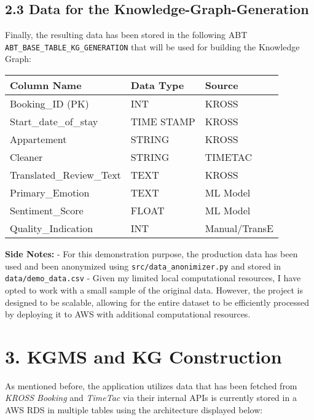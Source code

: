 \subsection{2.3 Data for the
Knowledge-Graph-Generation}\label{data-for-the-knowledge-graph-generation}

Finally, the resulting data has been stored in the following ABT
\texttt{ABT\_BASE\_TABLE\_KG\_GENERATION} that will be used for building
the Knowledge Graph:

\begin{longtable}[]{@{}lll@{}}
\toprule\noalign{}
Column Name & Data Type & Source \\
\midrule\noalign{}
\endhead
\bottomrule\noalign{}
\endlastfoot
Booking\_ID (PK) & INT & KROSS \\
Start\_date\_of\_stay & TIME STAMP & KROSS \\
Appartement & STRING & KROSS \\
Cleaner & STRING & TIMETAC \\
Translated\_Review\_Text & TEXT & KROSS \\
Primary\_Emotion & TEXT & ML Model \\
Sentiment\_Score & FLOAT & ML Model \\
Quality\_Indication & INT & Manual/TransE \\
\end{longtable}

\textbf{Side Notes:} - For this demonstration purpose, the production
data has been used and been anonymized using
\texttt{src/data\_anonimizer.py} and stored in
\texttt{data/demo\_data.csv} - Given my limited local computational
resources, I have opted to work with a small sample of the original
data. However, the project is designed to be scalable, allowing for the
entire dataset to be efficiently processed by deploying it to AWS with
additional computational resources.

\section{3. KGMS and KG Construction}\label{kgms-and-kg-construction}

As mentioned before, the application utilizes data that has been fetched
from \emph{KROSS Booking} and \emph{TimeTac} via their internal APIs is
currently stored in a AWS RDS in multiple tables using the architecture
displayed below:
\pandocbounded{}

